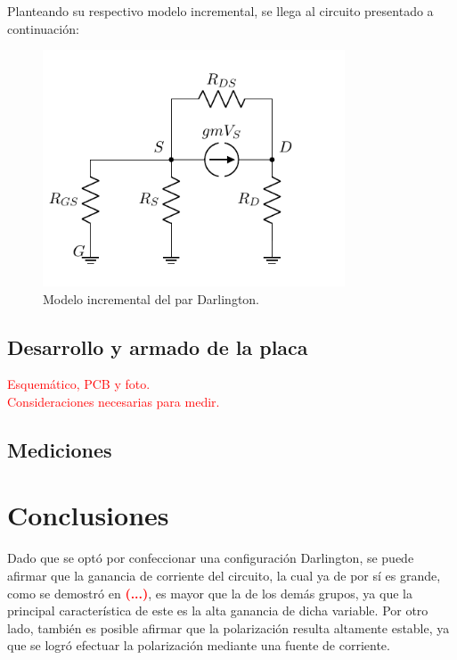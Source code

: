 Planteando su respectivo modelo incremental, se llega al circuito presentado a continuación: 
\begin{figure}[H]
\centering
	\includegraphics[width=0.8\textwidth, page=3]{Imagenes/ModeloIncremental.pdf}
	\caption{Modelo incremental del par Darlington.}
\label{fig:incdar}
\end{figure}

\subsection{Desarrollo y armado de la placa}
\begin{center}
	\LARGE{\textcolor{red}{Esquemático, PCB y foto.}}\\
	\LARGE{\textcolor{red}{Consideraciones necesarias para medir.}}
\end{center}

\subsection{Mediciones}

\section{Conclusiones}
Dado que se optó por confeccionar una configuración Darlington, se puede afirmar que la ganancia de corriente del circuito, la cual ya de por sí es grande, como se demostró en \textcolor{red}{\textbf{(...)}}, es mayor que la de los demás grupos, ya que la principal característica de este es la alta ganancia de dicha variable. Por otro lado, también es posible afirmar que la polarización resulta altamente estable, ya que se logró efectuar la polarización mediante una fuente de corriente.
	
